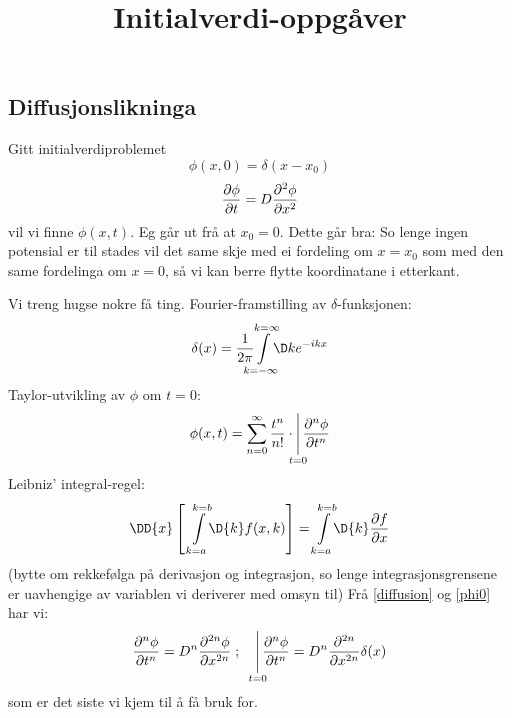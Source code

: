 \documentclass[12pt]{article}
\title{Initialverdi-oppgåver}
\begin{document}
\maketitle
\begin{multicols*}{2}\noindent %
    \section{Diffusjonslikninga}
    Gitt initialverdiproblemet
    \begin{equation}
        \phi(x, 0) = \delta(x - x_0)
        \label{phi0}
    \end{equation}
    \begin{equation}
        \frac{\partial \phi}{\partial t} = D\frac{\partial^{2} \phi}{\partial x ^{2}}
        \label{diffusion}
    \end{equation}
    vil vi finne $\phi(x, t)$.
    Eg går ut frå at $x_0 = 0$.
    Dette går bra: So lenge ingen potensial er til stades
    vil det same skje med ei fordeling om $x = x_0$ som med den
    same fordelinga om $x = 0$, så vi kan berre flytte
    koordinatane i etterkant.

    Vi treng hugse nokre få ting.
    Fourier-framstilling av $\delta$-funksjonen:
    \begin{equation}
        \delta(x) = \frac{1}{2\pi}
        \smashoperator{\int\limits_{k = -\infty}^{k = \infty}}
        \D k e^{-ikx}
        \label{deltafn}
    \end{equation}
    Taylor-utvikling av $\phi$ om $t = 0$:
    \begin{equation}
        \phi(x, t) = \sum_{n = 0}^\infty
        \frac{t^n}{n!} \cdot \smashoperator{\Sub\limits_{t = 0}} \deldelN{\phi}{t}{n}
        \label{tay}
    \end{equation}
    Leibniz' integral-regel:
    \begin{equation}
        \DD{x} \left[\;
            \smashoperator[r]{\int\limits_{k=a}^{k=b}} \D{k} f(x, k)
        \right]
        =
        \smashoperator[r]{\int\limits_{k=a}^{k=b}} \D{k} \deldel{f}{x}
        \label{papa}
    \end{equation}
    (bytte om rekkefølga på derivasjon og integrasjon,
     so lenge integrasjonsgrensene er uavhengige av
     variablen vi deriverer med omsyn til)
     Frå \eqref{diffusion} og \eqref{phi0} har vi:
    \begin{equation}
        \deldelN{\phi}{t}{n} = D^n \deldelN{\phi}{x}{2n}
        \;\text;\quad
        \smashoperator{\Sub\limits_{t=0}} \deldelN{\phi}{t}{n}
        = D^n \deldelN{}{x}{2n} \delta(x)
        \label{diffusionN}
    \end{equation}
    som er det siste vi kjem til å få bruk for.


\end{multicols*}
\end{document}
